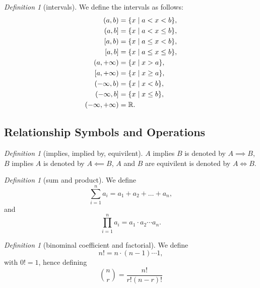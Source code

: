 \documentclass[8pt]{article}
\theoremstyle{remark}
\newtheorem{definition}[theorem]{Definition}
\begin{document}
            \begin{definition}[intervals]
                We define the intervals as follows:
                \begin{align*}
                    (a, b) &= \{x \mid a < x < b\},\\
                    (a, b] &= \{x \mid a < x \leq b\},\\
                    [a, b) &= \{x \mid a \leq x < b\},\\
                    [a, b] &= \{x \mid a \leq x \leq b\},\\
                    (a, +\infty) &= \{x \mid x > a\},\\
                    [a, +\infty) &= \{x \mid x \geq a\},\\
                    (-\infty, b) &= \{x \mid x < b\},\\
                    (-\infty, b] &= \{x \mid x \leq b\},\\
                    (-\infty, +\infty) &= \mathbb{R}.
                \end{align*}
            \end{definition}

        \subsection{Relationship Symbols and Operations}
            \begin{definition}[implies, implied by, equivilent]
                $A$ implies $B$ is denoted by $A \implies B$, $B$ implies $A$ is denoted by $A \impliedby B$, $A$ and $B$ are equivilent is denoted by $A \iff B$.
            \end{definition}

            \begin{definition}[sum and product]
                We define
                $$
                    \sum_{i = 1}^{n} a_i = a_1 + a_2 + \ldots + a_n,
                $$
                and
                $$
                    \prod_{i = 1}^{n} a_i = a_1 \cdot a_2 \cdots a_n.
                $$
            \end{definition}

            \begin{definition}[binominal coefficient and factorial]
                We define
                $$
                    n! = n \cdot (n - 1) \cdots 1,
                $$
                with $0! = 1$, hence defining
                $$
                    \binom{n}{r} = \frac{n!}{r!(n-r)!}
                $$
            \end{definition}
\end{document}
